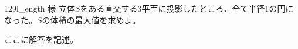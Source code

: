 \begin{prob}{129}{}{l\_ength 様}
 立体$S$をある直交する3平面に投影したところ、全て半径1の円になった。$S$の体積の最大値を求めよ。
\end{prob}

ここに解答を記述。